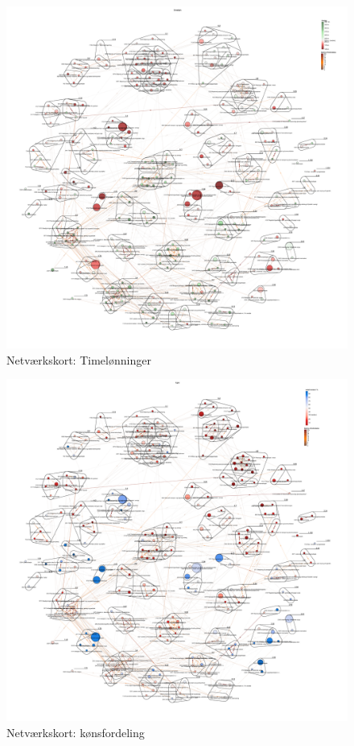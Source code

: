 \begin{figure}[H]
\begin{center}
	\caption{Netværkskort: Timelønninger}
	\label{appendiks kort timelon}
	\includegraphics[width=1.0\textwidth]{fig/netvaerkskort/kort_timelon.pdf}
\end{center}
\end{figure}
\restoregeometry

\begin{figure}[H]
\begin{center}
	\caption{Netværkskort: kønsfordeling}
	\label{appendiks kort koen}
	\includegraphics[width=1.0\textwidth]{fig/netvaerkskort/kort_koen.pdf}
\end{center}
\end{figure}
\restoregeometry


